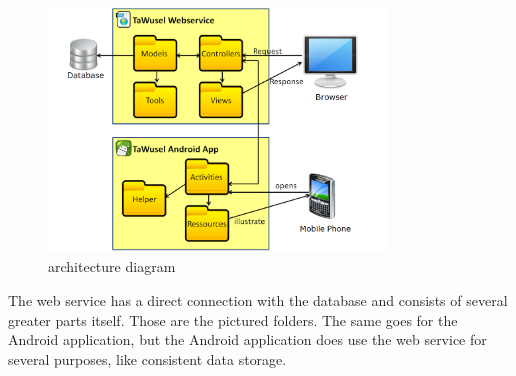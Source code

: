\begin{figure}[ht]
	\centering
	\includegraphics[width=0.8\textwidth]{images/Architekturdiagramm}
	\caption{architecture diagram}
	\label{img:Arch}
\end{figure}
The web service has a direct connection with the database and consists of several greater parts itself. Those are the pictured
folders. The same goes for the Android application, but the Android application does use the web service for several purposes,
like consistent data storage.

